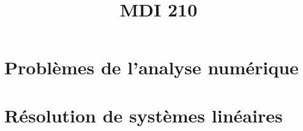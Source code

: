 \documentclass[a4paper,9pt]{article}
\title{\vspace{-1.2cm} MDI 210}
\date{}
\begin{document}
\maketitle

\vspace{-1.5cm}

\section{Problèmes de l'analyse numérique}

	

\section{Résolution de systèmes linéaires}

	
\end{document}
